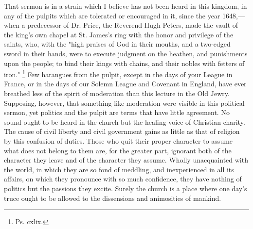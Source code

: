 That sermon is in a strain which I believe has not been heard in this kingdom, in any of the pulpits which are tolerated or encouraged in it, since the year 1648,—when a predecessor of Dr. Price, the Reverend Hugh Peters, made the vault of the king's own chapel at St. James's ring with the honor and privilege of the saints, who, with the "high praises of God in their mouths, and a two-edged sword in their hands, were to execute judgment on the heathen, and punishments upon the people; to bind their kings with chains, and their nobles with fetters of iron."
\footnote{ Ps. cxlix.}
 Few harangues from the pulpit, except in the days of your League in France, or in the days of our Solemn League and Covenant in England, have ever breathed less of the spirit of moderation than this lecture in the Old Jewry. Supposing, however, that something like moderation were visible in this political sermon, yet politics and the pulpit are terms that have little agreement. No sound ought to be heard in the church but the healing voice of Christian charity. The cause of civil liberty and civil government gains as little as that of religion by this confusion of duties. Those who quit their proper character to assume what does not belong to them are, for the greater part, ignorant both of the character they leave and of the character they assume. Wholly unacquainted with the world, in which they are so fond of meddling, and inexperienced in all its affairs, on which they pronounce with so much confidence, they have nothing of politics but the passions they excite. Surely the church is a place where one day's truce ought to be allowed to the dissensions and animosities of mankind.

